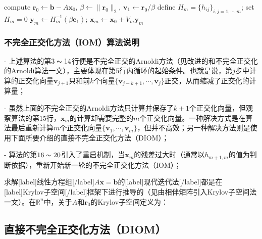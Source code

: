 \documentclass[UTF8,nofonts]{ctexart}
\begin{document}
\begin{algorithm}[H]
compute $\boldsymbol{r}_0\gets\boldsymbol{b}-A\boldsymbol{x}_0$, $\beta\gets\|\boldsymbol{r}_0\|_2$, $\boldsymbol{v}_1\gets\boldsymbol{r}_0/\beta$\;
define $H_m=\{h_{ij}\}_{i,j=1,\cdots,m}$; set $H_m=0$\;
$\boldsymbol{y}_m\gets H_m^{-1}(\beta\boldsymbol{e}_1)$; $\boldsymbol{x}_m\gets\boldsymbol{x}_0+V_m\boldsymbol{y}_m$\;
\end{algorithm}

\subsubsection*{不完全正交化方法（IOM）算法说明}

- 上述算法的第$3\thicksim14$行便是不完全正交的Arnoldi方法（见改进的和不完全正交化的Arnoldi算法一文），主要体现在第$5$行内循环的起始条件。也就是说，第$j$步中计算的正交化向量$\boldsymbol{v}_{j+1}$只和前$k$个向量$\{\boldsymbol{v}_{j-k+1},\cdots,\boldsymbol{v}_j\}$正交，从而缩减了正交化的计算量；

- 虽然上面的不完全正交的Arnoldi方法只计算并保存了$k+1$个正交化向量，但观察算法的第$15$行，$\boldsymbol{x}_m$的计算却需要完整的$m$个正交化向量。一种解决方式是在算法最后重新计算$m$个正交化向量$\{\boldsymbol{v}_1,\cdots,\boldsymbol{v}_m\}$，但并不高效；另一种解决方法则是使用下面所要介绍的直接不完全正交化方法（DIOM）；

- 算法的第$16\thicksim20$引入了重启机制，当$\boldsymbol{x}_m$的残差过大时（通常以$h_{m+1,m}$的值为判断依据），重新开始新一轮的不完全正交化方法（IOM）；

求解[label]线性方程组[/label]$A\boldsymbol{x}=\boldsymbol{b}$的[label]现代迭代法[/label]都是在[label]Krylov子空间[/label]框架下进行推导的（见由相伴矩阵引入Krylov子空间法一文）。在$\mathbb{R}^n$中，关于$A$和$\boldsymbol{r}_0$的Krylov子空间定义为：

\subsection*{直接不完全正交化方法（DIOM）}
\end{document}
